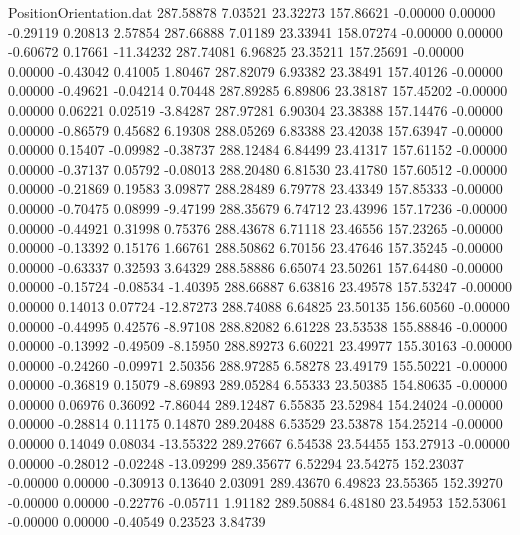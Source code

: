 \begin{filecontents}{PositionOrientation.dat}
 287.58878    7.03521   23.32273   157.86621   -0.00000    0.00000   -0.29119    0.20813    2.57854
 287.66888    7.01189   23.33941   158.07274   -0.00000    0.00000   -0.60672    0.17661  -11.34232
 287.74081    6.96825   23.35211   157.25691   -0.00000    0.00000   -0.43042    0.41005    1.80467
 287.82079    6.93382   23.38491   157.40126   -0.00000    0.00000   -0.49621   -0.04214    0.70448
 287.89285    6.89806   23.38187   157.45202   -0.00000    0.00000    0.06221    0.02519   -3.84287
 287.97281    6.90304   23.38388   157.14476   -0.00000    0.00000   -0.86579    0.45682    6.19308
 288.05269    6.83388   23.42038   157.63947   -0.00000    0.00000    0.15407   -0.09982   -0.38737
 288.12484    6.84499   23.41317   157.61152   -0.00000    0.00000   -0.37137    0.05792   -0.08013
 288.20480    6.81530   23.41780   157.60512   -0.00000    0.00000   -0.21869    0.19583    3.09877
 288.28489    6.79778   23.43349   157.85333   -0.00000    0.00000   -0.70475    0.08999   -9.47199
 288.35679    6.74712   23.43996   157.17236   -0.00000    0.00000   -0.44921    0.31998    0.75376
 288.43678    6.71118   23.46556   157.23265   -0.00000    0.00000   -0.13392    0.15176    1.66761
 288.50862    6.70156   23.47646   157.35245   -0.00000    0.00000   -0.63337    0.32593    3.64329
 288.58886    6.65074   23.50261   157.64480   -0.00000    0.00000   -0.15724   -0.08534   -1.40395
 288.66887    6.63816   23.49578   157.53247   -0.00000    0.00000    0.14013    0.07724  -12.87273
 288.74088    6.64825   23.50135   156.60560   -0.00000    0.00000   -0.44995    0.42576   -8.97108
 288.82082    6.61228   23.53538   155.88846   -0.00000    0.00000   -0.13992   -0.49509   -8.15950
 288.89273    6.60221   23.49977   155.30163   -0.00000    0.00000   -0.24260   -0.09971    2.50356
 288.97285    6.58278   23.49179   155.50221   -0.00000    0.00000   -0.36819    0.15079   -8.69893
 289.05284    6.55333   23.50385   154.80635   -0.00000    0.00000    0.06976    0.36092   -7.86044
 289.12487    6.55835   23.52984   154.24024   -0.00000    0.00000   -0.28814    0.11175    0.14870
 289.20488    6.53529   23.53878   154.25214   -0.00000    0.00000    0.14049    0.08034  -13.55322
 289.27667    6.54538   23.54455   153.27913   -0.00000    0.00000   -0.28012   -0.02248  -13.09299
 289.35677    6.52294   23.54275   152.23037   -0.00000    0.00000   -0.30913    0.13640    2.03091
 289.43670    6.49823   23.55365   152.39270   -0.00000    0.00000   -0.22776   -0.05711    1.91182
 289.50884    6.48180   23.54953   152.53061   -0.00000    0.00000   -0.40549    0.23523    3.84739

\end{filecontents}
